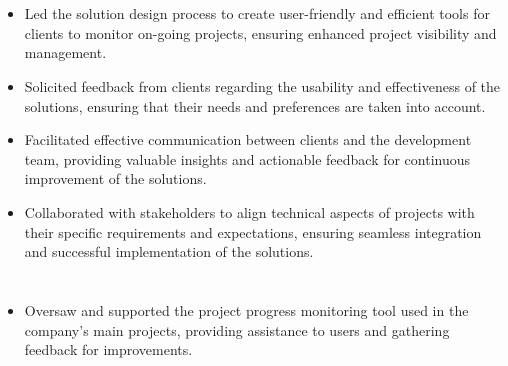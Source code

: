 \documentclass[12pt]{res} %
\begin{document}
\begin{resume}
\begin{multicols}{2}
	\section{}
	\vspace{10pt}
	\begin{itemize}
		\item Led the solution design process to create user-friendly and efficient tools for clients to monitor on-going projects, ensuring enhanced project visibility and management.
		\item Solicited feedback from clients regarding the usability and effectiveness of the solutions, ensuring that their needs and preferences are taken into account.
		\item Facilitated effective communication between clients and the development team, providing valuable insights and actionable feedback for continuous improvement of the solutions.
		\item Collaborated with stakeholders to align technical aspects of projects with their specific requirements and expectations, ensuring seamless integration and successful implementation of the solutions.
	\end{itemize}
	\section{}
	\vspace{10pt}
	\begin{itemize}
		\item Oversaw and supported the project progress monitoring tool used in the company's main projects, providing assistance to users and gathering feedback for improvements.
	\end{itemize}
\end{multicols}


\end{resume}
\end{document}
